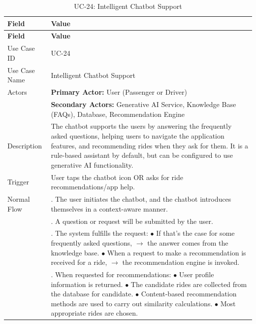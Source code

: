\begin{longtable}{|>{\raggedright\arraybackslash}p{4cm}|>{\raggedright\arraybackslash}p{11cm}|}
\caption{UC-24: Intelligent Chatbot Support}
\label{tab:uc-24} \\
\hline
\rowcolor{lightgray!30}
\textbf{Field} & \textbf{Value} \\
\hline
\endfirsthead
\hline
\rowcolor{lightgray!30}
\textbf{Field} & \textbf{Value} \\
\hline
\endhead
\hline
\endfoot
\hline
\endlastfoot
Use Case ID & UC-24 \\
\hline
Use Case Name & Intelligent Chatbot Support \\
\hline
Actors & \textbf{Primary Actor:} User (Passenger or Driver) \\
& \textbf{Secondary Actors:} Generative AI Service, Knowledge Base (FAQs), Database, Recommendation Engine \\
\hline
Description & The chatbot supports the users by answering the frequently asked questions, helping users to navigate the application features, and recommending rides when they ask for them. It is a rule-based assistant by default, but can be configured to use generative AI functionality. \\
\hline
Trigger & User taps the chatbot icon OR asks for ride recommendations/app help. \\
\hline
Normal Flow & 1. The user initiates the chatbot, and the chatbot introduces themselves in a context-aware manner. \\
& 2. A question or request will be submitted by the user. \\
& 3. The system fulfills the request: \newline $\bullet$ If that's the case for some frequently asked questions, $\rightarrow$ the answer comes from the knowledge base. \newline $\bullet$ When a request to make a recommendation is received for a ride, $\rightarrow$ the recommendation engine is invoked. \\
& 4. When requested for recommendations: \newline $\bullet$ User profile information is returned. \newline $\bullet$ The candidate rides are collected from the database for candidate. \newline $\bullet$ Content-based recommendation methods are used to carry out similarity calculations. \newline $\bullet$    Most appropriate rides are chosen. \\

\end{longtable}
